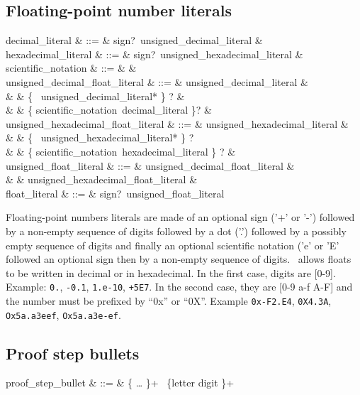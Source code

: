 \subsection{Floating-point number literals}
\begin{syntax}
decimal\_literal & ::= & sign?\ unsigned\_decimal\_literal & \\
hexadecimal\_literal & ::= & sign?\ unsigned\_hexadecimal\_literal & \\
scientific\_notation & ::= &  \mid {} & \\
unsigned\_decimal\_float\_literal & ::= & unsigned\_decimal\_literal & \\
& &  \{ \ unsigned\_decimal\_literal* \} ? & \\
& &  \{ scientific\_notation\ decimal\_literal \}? & \\
unsigned\_hexadecimal\_float\_literal & ::= & unsigned\_hexadecimal\_literal &\\
& & \{ \ unsigned\_hexadecimal\_literal* \} ? \\
& & \{ scientific\_notation\ hexadecimal\_literal \} ? & \\
unsigned\_float\_literal & ::= & unsigned\_decimal\_float\_literal & \\
& & \mid unsigned\_hexadecimal\_float\_literal & \\
float\_literal & ::= & sign?\ unsigned\_float\_literal
\end{syntax}

Floating-point numbers literals are made of an optional sign ('+' or
'-') followed by a non-empty sequence of digits followed by a dot
('.') followed by a possibly empty sequence of digits and finally an
optional scientific notation ('e' or 'E' followed an optional sign
then by a non-empty sequence of digits. \focal\ allows floats to be
written in decimal or in hexadecimal. In the first case, digits are
[0-9]. Example: {\tt 0.}, {\tt -0.1}, {\tt 1.e-10}, {\tt +5E7}.
In the second case, they are [0-9 a-f A-F] and the number must be
prefixed by ``0x'' or ``0X''. Example {\tt 0x-F2.E4}, {\tt 0X4.3A},
{\tt Ox5a.a3eef}, {\tt Ox5a.a3e-ef}.



\subsection{Proof step bullets}
\begin{syntax}
proof\_step\_bullet & ::= &
   \terminal{<} \{  \ldots {} \}+ \terminal{>}
   \ \{letter \mid digit \}+
\end{syntax}

